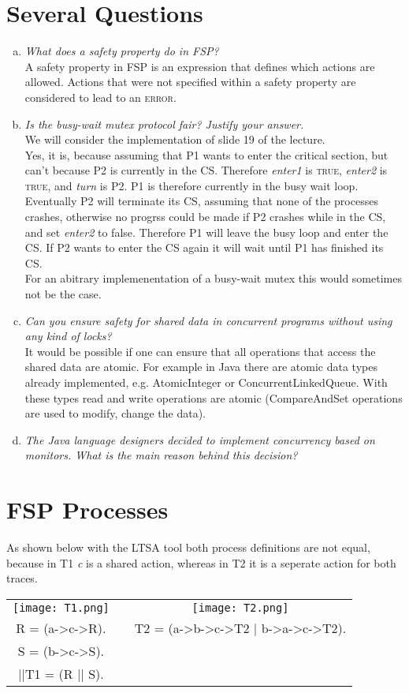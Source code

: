 \documentclass{report}
\author{Marcel \textsc{Zauder} 16-124-836 \\
	Pascal \textsc{Gerig} 16-104-721}
\begin{document}
	\section{Several Questions}
	\startsection
		\begin{enumerate}[a)]
			\item \textit{What does a safety property do in FSP?} \\
			A safety property in FSP is an expression that defines which actions are allowed. Actions that were not specified within a safety property are considered to lead to an \textsc{error}.
			\item \textit{Is the busy-wait mutex protocol fair? Justify your answer.} \\
			We will consider the implementation of slide 19 of the lecture. \\
			Yes, it is, because assuming that P1 wants to enter the critical section, but can't because P2 is currently in the CS. Therefore \textit{enter1} is \textsc{true}, \textit{enter2} is \textsc{true}, and \textit{turn} is P2. P1 is therefore currently in the busy wait loop. Eventually P2 will terminate its CS, assuming that none of the processes crashes, otherwise no progrss could be made if P2 crashes while in the CS, and set \textit{enter2} to false. Therefore P1 will leave the busy loop and enter the CS. If P2 wants to enter the CS again it will wait until P1 has finished its CS. \\
			For an abitrary implemenentation of a busy-wait mutex this would sometimes not be the case.
			\item \textit{Can you ensure safety for shared data in concurrent programs without using any kind of locks?} \\
			It would be possible if one can ensure that all operations that access the shared data are atomic. For example in Java there are atomic data types already implemented, e.g. AtomicInteger or ConcurrentLinkedQueue. With these types read and write operations are atomic (CompareAndSet operations are used to modify, change the data). 
			\item \textit{The Java language designers decided to implement concurrency based on monitors. What is the main reason behind this decision?} \\
		\end{enumerate}
	\closesection
	
	\section{FSP Processes}
	\startsection
		As shown below with the LTSA tool both process definitions are not equal, because in T1 \textit{c} is a shared action, whereas in T2 it is a seperate action for both traces. \\
		\begin{tabular}{ccc}
			\texttt{[image: T1.png]} && \texttt{[image: T2.png]} \\
			R = (a->c->R). && T2 = (a->b->c->T2 | b->a->c->T2). \\
			S = (b->c->S). \\
			||T1 = (R || S).
		\end{tabular}
	\closesection
	
\end{document}
